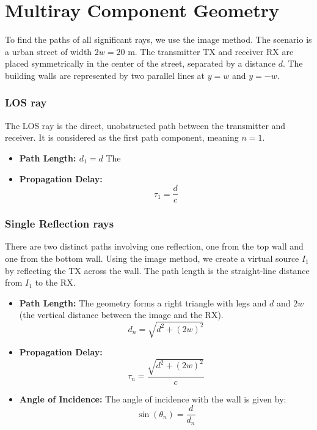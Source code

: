 \section{Multiray Component Geometry}
To find the paths of all significant rays, we use the image method. The scenario is a urban street of width $2w = 20$ m. The transmitter TX and receiver RX are placed symmetrically in the center of the street, separated by a distance $d$. The building walls are represented by two parallel lines at $y = w$ and $y = -w$.

\subsubsection{LOS ray}
The LOS ray is the direct, unobstructed path between the transmitter and receiver. It is considered as the first path component, meaning $n=1$.
\begin{itemize}
	\item \textbf{Path Length: $d_1 = d$} The
	\item \textbf{Propagation Delay:}
	\begin{equation}
		\tau_{1} = \frac{d}{c}
	\end{equation}
\end{itemize}

\subsubsection{Single Reflection rays}
There are two distinct paths involving one reflection, one from the top wall and one from the bottom wall. Using the image method, we create a virtual source $I_1$ by reflecting the TX across the wall. The path length is the straight-line distance from $I_1$ to the RX.
\begin{itemize}
	\item \textbf{Path Length:} The geometry forms a right triangle with legs and $d$ and $2w$ (the vertical distance between the image and the RX).
	\begin{equation}
		d_{n} = \sqrt{d^2 + (2w)^2}
	\end{equation}
	\item \textbf{Propagation Delay:}
	\begin{equation}
		\tau_{n} = \frac{\sqrt{d^2 + (2w)^2}}{c}
	\end{equation}
	\item \textbf{Angle of Incidence:} The angle of incidence with the wall is given by:
	\begin{equation}
		\sin(\theta_{n}) = \frac{d}{d_{n}}
	\end{equation}
\end{itemize}

